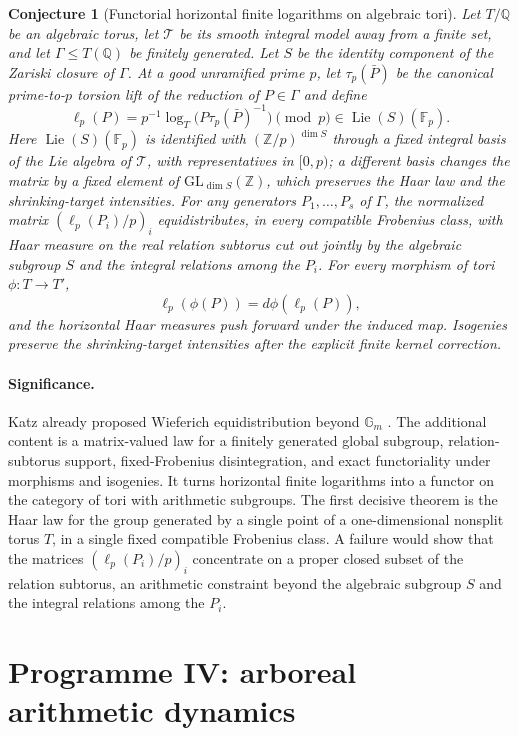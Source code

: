 \documentclass[11pt]{article}
\newtheorem{conjecture}{Conjecture}
\theoremstyle{definition}
\newcommand{\Fq}{\mathbb F}
\newcommand{\Z}{\mathbb Z}
\newcommand{\Q}{\mathbb Q}
\providecommand{\Z}{\mathbb Z}
\providecommand{\Q}{\mathbb Q}
\begin{document}
\begin{conjecture}[Functorial horizontal finite logarithms on algebraic tori]\label{s15}
Let $T/\Q$ be an algebraic torus, let $\mathcal T$ be its smooth integral model away from
a finite set, and let $\Gamma\le T(\Q)$ be finitely generated.  Let $S$ be the identity
component of the Zariski closure of $\Gamma$.  At a good unramified prime $p$, let
$\tau_p(\bar P)$ be the canonical prime-to-$p$ torsion lift of the reduction of
$P\in\Gamma$ and define
\[
 \ell_p(P)=p^{-1}\log_T\bigl(P\tau_p(\bar P)^{-1}\bigr)\pmod p
 \in\operatorname{Lie}(S)(\Fq_p).
\]
Here $\operatorname{Lie}(S)(\Fq_p)$ is identified with $(\Z/p)^{\dim S}$ through a fixed integral basis of the Lie algebra of $\mathcal T$, with representatives in $[0,p)$; a different basis changes the matrix by a fixed element of $\mathrm{GL}_{\dim S}(\Z)$, which preserves the Haar law and the shrinking-target intensities.  For any generators $P_1,\ldots,P_s$ of $\Gamma$, the normalized matrix
$(\ell_p(P_i)/p)_i$ equidistributes, in every compatible Frobenius class, with Haar
measure on the real relation subtorus cut out jointly by the algebraic subgroup $S$ and
the integral relations among the $P_i$.  For every morphism of tori $\phi:T\to T'$,
\[
 \ell_p(\phi(P))=d\phi(\ell_p(P)),
\]
and the horizontal Haar measures push forward under the induced map.  Isogenies preserve
the shrinking-target intensities after the explicit finite kernel correction.
\end{conjecture}

\paragraph{Significance.}
Katz already proposed Wieferich equidistribution beyond $\mathbb G_m$ \cite{Katz}.  The
additional content is a matrix-valued law for a finitely generated global subgroup,
relation-subtorus support, fixed-Frobenius disintegration, and exact functoriality under
morphisms and isogenies.  It turns horizontal finite logarithms into a functor on the category of tori with arithmetic subgroups. The first decisive theorem is the Haar law for the group generated by a single point of a one-dimensional nonsplit torus $T$, in a single fixed compatible Frobenius class. A failure would show that the matrices $(\ell_p(P_i)/p)_i$ concentrate on a proper closed subset of the relation subtorus, an arithmetic constraint beyond the algebraic subgroup $S$ and the integral relations among the $P_i$.

\section{Programme IV: arboreal arithmetic dynamics}
\end{document}
